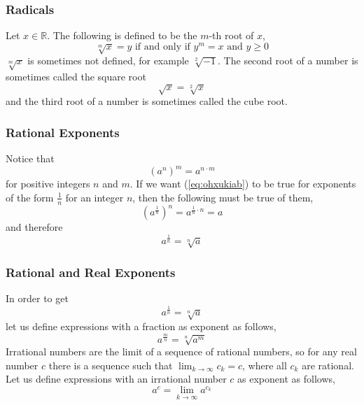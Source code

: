 \documentclass[xcolor=dvipsnames]{beamer}
\begin{document}
\begin{frame}
  \frametitle{Radicals}
  Let $x\in\mathbb{R}$. The following is defined to be the \alert{$m$-th root}
  of $x$,
  \begin{equation}
    \label{eq:zeeroola}
    \sqrt[m]{x}=y\mbox{ if and only if }y^{m}=x\mbox{ and }y\geq{}0
  \end{equation}
$\sqrt[m]{x}$ is sometimes not defined, for example $\sqrt[2]{-1}$.
The second root of a number is sometimes called the \alert{square
  root}
\begin{equation}
  \label{eq:ieghaeve}
  \sqrt{x}=\sqrt[2]{x}
\end{equation}
and the third root of a number is sometimes called the \alert{cube root}.
\end{frame}

\begin{frame}
  \frametitle{Rational Exponents}
Notice that
\begin{equation}
  \label{eq:ohxukiab}
  \left(a^{n}\right)^{m}=a^{n\cdot{}m}
\end{equation}
for positive integers $n$ and $m$. If we want (\ref{eq:ohxukiab}) to
be true for exponents of the form $\frac{1}{n}$ for an integer $n$,
then the following must be true of them,
\begin{equation}
  \label{eq:aivienai}
  \left(a^{\frac{1}{n}}\right)^{n}=a^{\frac{1}{n}\cdot{}n}=a
\end{equation}
and therefore
\begin{equation}
  \label{eq:kaohahae}
  a^{\frac{1}{n}}=\sqrt[n]{a}
\end{equation}
\end{frame}

\begin{frame}
  \frametitle{Rational and Real Exponents}
In order to get
\begin{equation}
  \label{eq:yahdahse}
  a^{\frac{1}{n}}=\sqrt[n]{a}
\end{equation}
let us define expressions with a fraction as exponent as follows,
\begin{equation}
  \label{eq:aiweelef}
  a^{\frac{m}{n}}=\sqrt[n]{a^{m}}
\end{equation}
Irrational numbers are the limit of a sequence of rational numbers, so
for any real number $c$ there is a sequence such that
$\lim_{k\rightarrow{}\infty}c_{k}=c$, where all $c_{k}$ are rational.
Let us define expressions with an irrational number $c$ as exponent as
follows,
\begin{equation}
  \label{eq:iefiemae}
  a^{c}=\lim_{k\rightarrow{}\infty}a^{c_{k}}
\end{equation}
\end{frame}
\end{document}

